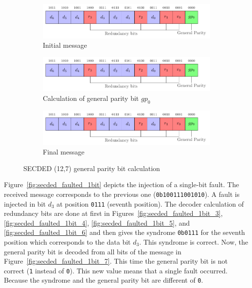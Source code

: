 \begin{figure}[ht]
    \centering
    \begin{subfigure}[b]{0.49\textwidth}
        \includegraphics[width=\textwidth, page=2]{c5_countermeasures_dift/img/secded.pdf}
        \caption{Initial message}
        \label{fig:secded_example_1}
    \end{subfigure}
    \hfill
    \begin{subfigure}[b]{0.49\textwidth}
        \includegraphics[width=\textwidth, page=4]{c5_countermeasures_dift/img/secded.pdf}
        \caption{Calculation of general parity bit $gp_0$}
        \label{fig:secded_example_2}
    \end{subfigure}
    \hfill
    \begin{subfigure}[b]{0.49\textwidth}
        \includegraphics[width=\textwidth, page=5]{c5_countermeasures_dift/img/secded.pdf}
        \caption{Final message}
        \label{fig:secded_example_3}
    \end{subfigure}
    \caption{SECDED (12,7) general parity bit calculation}
    \label{fig:secded_example}
\end{figure}

Figure~\ref{fig:secded_faulted_1bit} depicts the injection of a single-bit fault. The received message corresponds to the previous one (\texttt{0b100111001010}). A fault is injected in bit $d_3$ at position \texttt{0111} (seventh position).
The decoder calculation of redundancy bits are done at first in Figures~\ref{fig:secded_faulted_1bit_3}, \ref{fig:secded_faulted_1bit_4}, \ref{fig:secded_faulted_1bit_5}, and \ref{fig:secded_faulted_1bit_6} and then gives the syndrome \texttt{0b0111} for the seventh position which corresponds to the data bit $d_3$. This syndrome is correct. Now, the general parity bit is decoded from all bits of the message in Figure~\ref{fig:secded_faulted_1bit_7}. This time the general parity bit is not correct (\texttt{1} instead of \texttt{0}). This new value means that a single fault occurred. Because the syndrome and the general parity bit are different of \texttt{0}.

